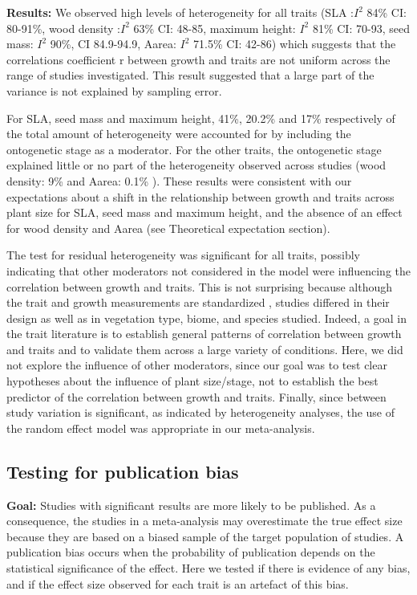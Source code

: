 \documentclass[10pt,twoside]{article}\usepackage[]{graphicx}\usepackage[]{color}
\begin{document}
\noindent\textbf{Results:} We observed high levels of heterogeneity for all traits (SLA :$I^{2}$ 84\% CI: 80-91\%, wood density :$I^{2}$ 63\% CI: 48-85, maximum height: $I^{2}$ 81\% CI: 70-93, seed mass: $I^{2}$ 90\%, CI 84.9-94.9, Aarea: $I^{2}$ 71.5\% CI: 42-86) which suggests that the correlations coefficient r between growth and traits are not uniform across the range of studies investigated. This result suggested that a large part of the variance is not explained by sampling error.

For SLA, seed mass and maximum height, 41\%, 20.2\% and 17\% respectively of the total amount of heterogeneity were accounted for by including the ontogenetic stage as a moderator. For the other traits, the ontogenetic stage explained little or no part of the heterogeneity observed across studies (wood density: 9\% and Aarea: 0.1\% ). These results were consistent with our expectations about a shift in the relationship between growth and traits across plant size for SLA, seed mass and maximum height, and the absence of an effect for wood density and Aarea (see Theoretical expectation section).

The test for residual heterogeneity was significant for all traits, possibly indicating that other moderators not considered in the model were influencing the correlation between growth and traits. This is not surprising because although the trait and growth measurements are standardized \citep{Cornelissen:2003gw}, studies differed in their design as well as in vegetation type, biome, and species studied. Indeed, a goal in the trait literature is to establish general patterns of correlation between growth and traits and to validate them across a large variety of conditions. Here, we did not explore the influence of other moderators, since our goal was to test clear hypotheses about the influence of plant size/stage, not to establish the best predictor of the correlation between growth and traits. Finally, since between study variation is significant, as indicated by heterogeneity analyses, the use of the random effect model was appropriate in our meta-analysis.
\clearpage

\subsection{Testing for publication bias}
\noindent\textbf{Goal:} Studies with significant results are more likely to be published. As a consequence, the studies in a meta-analysis may overestimate the true effect size because they are based on a biased sample of the target population of studies. A publication bias occurs when the probability of publication depends on the statistical significance of the effect. Here we tested if there is evidence of any bias, and if the effect size observed for each trait is an artefact of this bias.
\end{document}
